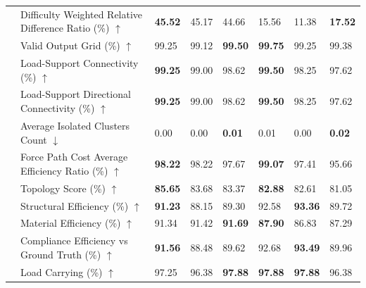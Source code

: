 \begin{table}[!h]
{\begin{tabular}{lllll|lll}
 & Difficulty Weighted Relative Difference Ratio (\%) $\uparrow$ & \textbf{45.52} & 45.17 & 44.66 & 15.56 & 11.38 & \textbf{17.52} \\
 & Valid Output Grid (\%) $\uparrow$ & 99.25 & 99.12 & \textbf{99.50} & \textbf{99.75} & 99.25 & 99.38 \\
 & Load-Support Connectivity (\%) $\uparrow$ & \textbf{99.25} & 99.00 & 98.62 & \textbf{99.50} & 98.25 & 97.62 \\
 & Load-Support Directional Connectivity (\%) $\uparrow$ & \textbf{99.25} & 99.00 & 98.62 & \textbf{99.50} & 98.25 & 97.62 \\
 & Average Isolated Clusters Count $\downarrow$ & 0.00 & 0.00 & \textbf{0.01} & 0.01 & 0.00 & \textbf{0.02} \\
 & Force Path Cost Average Efficiency Ratio (\%) $\uparrow$ & \textbf{98.22} & 98.22 & 97.67 & \textbf{99.07} & 97.41 & 95.66 \\
 & Topology Score (\%) $\uparrow$ & \textbf{85.65} & 83.68 & 83.37 & \textbf{82.88} & 82.61 & 81.05 \\
 & Structural Efficiency (\%) $\uparrow$ & \textbf{91.23} & 88.15 & 89.30 & 92.58 & \textbf{93.36} & 89.72 \\
 & Material Efficiency (\%) $\uparrow$ & 91.34 & 91.42 & \textbf{91.69} & \textbf{87.90} & 86.83 & 87.29 \\
 & Compliance Efficiency vs Ground Truth (\%) $\uparrow$ & \textbf{91.56} & 88.48 & 89.62 & 92.68 & \textbf{93.49} & 89.96 \\
 & Load Carrying (\%) $\uparrow$ & 97.25 & 96.38 & \textbf{97.88} & \textbf{97.88} & \textbf{97.88} & 96.38 \\
    \bottomrule
  \end{tabular}
  }
\end{table}